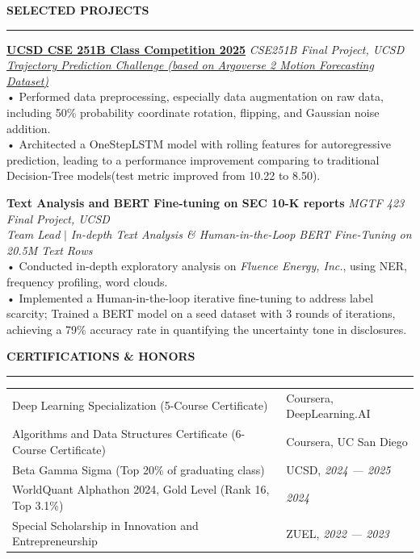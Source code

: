 \documentclass{resume} %
\renewcommand{\sectionskip}{\vspace{0.10cm}}        %
\renewcommand{\sectionlineskip}{\vspace{0.10cm}}
\renewenvironment{rSection}[1]{
\sectionskip
\textcolor{UC San Diego Blue}{\textbf{\large\bfseries\MakeUppercase{#1}}}

\sectionlineskip
\hrule
\begin{list}{}{
\setlength{\leftmargin}{0em}
}
\item[]
}{
\end{list}
}
\begin{document}
\begin{rSection}{SELECTED PROJECTS}
\href{https://github.com/YuankaiTao-super/CSE-251B-Final-Project}{\textbf{UCSD CSE 251B Class Competition 2025}} \hfill \textit{CSE251B Final Project, UCSD}\\
\textit{\href{https://www.kaggle.com/competitions/cse-251-b-2025}{Trajectory Prediction Challenge (based on Argoverse 2 Motion Forecasting Dataset)}}\\[4pt]
• Performed data preprocessing, especially data augmentation on raw data, including 50\% probability coordinate rotation, flipping, and Gaussian noise addition. \\[1.5pt]
• Architected a OneStepLSTM model with rolling features for autoregressive prediction, leading to a performance improvement comparing to traditional Decision-Tree models(test metric improved from 10.22 to 8.50).

\textbf{Text Analysis and BERT Fine-tuning on SEC 10-K reports} \hfill \textit{MGTF 423 Final Project, UCSD}\\
\textit{Team Lead} $|$ \textit{In-depth Text Analysis \& Human-in-the-Loop BERT Fine-Tuning on 20.5M Text Rows} \\[4pt]
• Conducted in-depth exploratory analysis on \textit{Fluence Energy, Inc.}, using NER, frequency profiling, word clouds.\\[1.5pt]
• Implemented a Human-in-the-loop iterative fine-tuning to address label scarcity; Trained a BERT model on a seed dataset with 3 rounds of iterations, achieving a 79\% accuracy rate in quantifying the uncertainty tone in disclosures.

\end{rSection}

\begin{rSection}{Certifications \& Honors}
\begin{tabularx}{\textwidth}{@{} >{\raggedright\arraybackslash}X >{\raggedleft\arraybackslash\hyphenpenalty=10000\exhyphenpenalty=10000}p{4.8cm} @{}}
Deep Learning Specialization (5-Course Certificate) & Coursera, DeepLearning.AI \\
Algorithms and Data Structures Certificate (6-Course Certificate) & Coursera, UC San Diego \\
Beta Gamma Sigma (Top 20\% of graduating class) & UCSD, {\em 2024 --- 2025} \\
WorldQuant Alphathon 2024, Gold Level (Rank 16, Top 3.1\%) & {\em 2024} \\
Special Scholarship in Innovation and Entrepreneurship & ZUEL, {\em 2022 --- 2023}
\end{tabularx}
\end{rSection}
\end{document}
